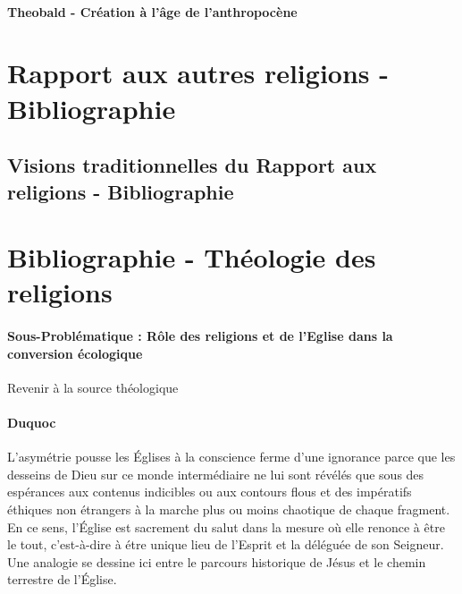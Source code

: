 \paragraph{Theobald - Création à l'âge de l'anthropocène}
\cite{theobald_repenser_2019}



\section{Rapport aux autres religions - Bibliographie}


\subsection{Visions traditionnelles du Rapport aux religions - Bibliographie}

\section{Bibliographie - Théologie des religions}
\paragraph{Sous-Problématique : Rôle des religions et de l'Eglise dans la conversion écologique } Revenir à la source théologique



\paragraph{Duquoc}    
\begin{singlequote}
    L'asymétrie pousse les Églises à la conscience ferme d'une ignorance parce que les desseins de Dieu sur ce monde intermédiaire ne lui sont révélés que sous des espérances aux contenus indicibles ou aux contours flous et des impératifs éthiques non étrangers à la marche plus ou moins chaotique de chaque fragment. En ce sens, l'Église est sacrement du salut dans la mesure où elle renonce à être le tout, c'est-à-dire à étre unique lieu de l'Esprit et la déléguée de son Seigneur. Une analogie se dessine ici entre le parcours historique de Jésus et le chemin terrestre de l'Église. \cite[p 241]{duquoc_unique_2002}
\end{singlequote}


